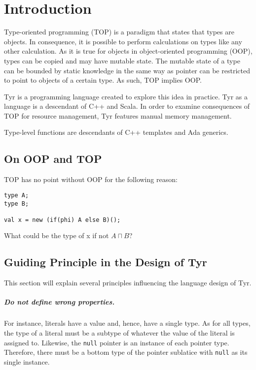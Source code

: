 
\section{Introduction}

Type-oriented programming (TOP) is a paradigm that states that types are objects.
In consequence, it is possible to perform calculations on types like any other calculation.
As it is true for objects in object-oriented programming (OOP), types can be copied and may have mutable state.
The mutable state of a type can be bounded by static knowledge in the same way as pointer can be restricted to point to objects of a certain type.
As such, TOP implies OOP.

Tyr is a programming language created to explore this idea in practice.
Tyr as a language is a descendant of C++ and Scala.
In order to examine consequences of TOP for resource management, Tyr features manual memory management.

Type-level functions are descendants of C++ templates and Ada generics.


\subsection{On OOP and TOP}

TOP has no point without OOP for the following reason:

\begin{lstlisting}
type A;
type B;

val x = new (if(phi) A else B)();
\end{lstlisting}

What could be the type of x if not $A \sqcap B$?


\subsection{Guiding Principle in the Design of Tyr}

This section will explain several principles influencing the language design of Tyr.

\subparagraph{Do not define wrong properties.}

For instance, literals have a value and, hence, have a single type.
As for all types, the type of a literal must be a subtype of whatever the value of the literal is assigned to.
Likewise, the \texttt{null} pointer is an instance of each pointer type.
Therefore, there must be a bottom type of the pointer sublatice with \texttt{null} as its single instance.

